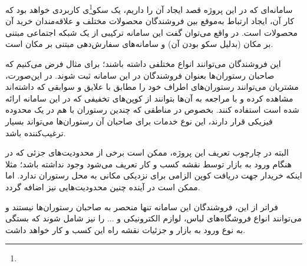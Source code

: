 
سامانه‌ای که در این پروژه قصد ایجاد آن را داریم، یک سکو\footnote{}ی کاربردی خواهد بود که کار آن، ایجاد ارتباط به‌موقع بین فروشندگان محصولات مختلف و علاقه‌مندان خرید آن محصولات است. در واقع می‌توان گفت این سامانه ترکیبی از یک شبکه اجتماعی مبتنی بر مکان (بدلیل سکو بودن آن) و سامانه‌های سفارش‌دهی مبتنی بر مکان است.

این فروشندگان می‌توانند انواع مختلفی داشته باشند؛ برای مثال فرض می‌کنیم که صاحبان رستوران‌ها بعنوان فروشندگان در این سامانه ثبت شوند. در این‌صورت، مشتریان می‌توانند رستوران‌های اطراف خود را مطابق با علایق و سوابقی که داشته‌اند مشاهده کرده و با مراجعه به آن‌ها بتوانند از کوپن‌های تخفیفی که در این سامانه ارائه شده است استفاده کنند. بخصوص در مناطقی که چندین رستوران با هم در یک محدوده فیزیکی قرار دارند، این نوع خدمات برای صاحبان آن رستوران‌ها می‌تواند بسیار ترغیب‌کننده باشد.

البته در چارچوب تعریف این پروژه، ممکن است برخی از محدودیت‌های جزئی که در هنگام ورود به بازار توسط نقشه کسب و کار تعریف می‌شود وجود نداشته باشد؛ مثلا اینکه خریدار جهت دریافت کوپن الزامی برای نزدیکی مکانی به محل رستوران ندارد. اما ممکن است در آینده چنین محدودیت‌هایی نیز اضافه گردد.

فراتر از این، فروشندگان این سامانه تنها منحصر به صاحبان رستوران‌ها نیستند و می‌توانند انواع فروشگاه‌های لباس، لوازم الکترونیکی و ... را نیز شامل شوند که بستگی به نوع ورود به بازار و جزئیات نقشه راه این کسب و کار خواهد داشت.
